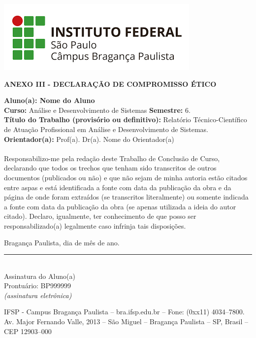 \documentclass[12pt,a4paper]{report}
\newcommand{\cabecalho}{ANEXO III - DECLARAÇÃO DE COMPROMISSO ÉTICO}
\begin{document}
    \includegraphics[scale=0.35]{IFSP-BRA.png}	
    \hline
    \vspace{1.2cm}
	\begin{center}
		{\large\textbf{\cabecalho}}\\
	\end{center}

	\vspace{2cm}
	\noindent \textbf{Aluno(a): \textbf{Nome do Aluno} } \\
	\noindent \textbf{Curso:} Análise e Desenvolvimento de Sistemas \hspace{0.03cm} \textbf{Semestre:}  6\textdegree.  \\

	\noindent\textbf{Título do Trabalho (provisório ou definitivo): } Relatório Técnico-Científico de Atuação Profissional em Análise e Desenvolvimento de Sistemas. \\

	\noindent \textbf{Orientador(a): } Prof(a). Dr(a). Nome do Orientador(a) \\
    \\

    \noindent Responsabilizo-me pela redação deste Trabalho de Conclusão de Curso, declarando que todos os trechos que tenham sido transcritos de outros documentos (publicados ou não) e que não sejam de minha autoria estão citados entre aspas e está identificada a fonte com data da publicação da obra e da página de onde foram extraídos (se transcritos literalmente) ou somente indicada a fonte com data da publicação da obra (se apenas utilizada a ideia do autor citado). Declaro, igualmente, ter conhecimento de que posso ser responsabilizado(a) legalmente caso infrinja tais disposições.\\
    
     \vspace{1.5cm}
    \begin{center}
        {Bragança Paulista, dia de mês de ano.}
	\end{center}
	\vspace{2cm}
	\begin{table}[ht]
		\centering \rule{10cm}{0.1pt}               
		\\ \small{Assinatura do Aluno(a)}
		\\ \small{Prontuário: BP999999} \\  \scriptsize{\textit{(assinatura eletrônica)}}
	\end{table}

    \vspace{2cm}
	\hline 
	\vspace{0.2cm}
	\centering \tiny{IFSP - Campus Bragança Paulista – bra.ifsp.edu.br – Fone: (0xx11) 4034–7800.
Av. Major Fernando Valle, 2013 – São Miguel – Bragança Paulista – SP, Brasil – CEP 12903–000}
\end{document}
